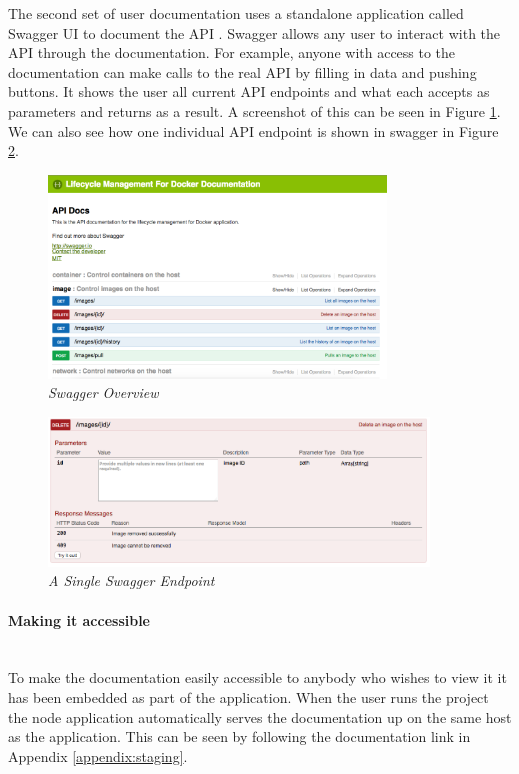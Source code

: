 The second set of user documentation uses a standalone application called Swagger UI to document the API \citep{Swagger2017}. Swagger allows any user to interact with the API through the documentation. For example, anyone with access to the documentation can make calls to the real API by filling in data and pushing buttons. It shows the user all current API endpoints and what each accepts as parameters and returns as a result. A screenshot of this can be seen in Figure \ref{fig:swagger-overview}. We can also see how one individual API endpoint is shown in swagger in Figure \ref{fig:swagger-individual}.

\begin{figure}[!ht]
\centering
\includegraphics*[width=0.8\textwidth]{images/swagger-overview}
\caption{\em Swagger Overview}
\label{fig:swagger-overview}
\end{figure}

\begin{figure}[!ht]
\centering
\includegraphics*[width=0.9\textwidth]{images/swagger-individual}
\caption{\em A Single Swagger Endpoint}
\label{fig:swagger-individual}
\end{figure}

\paragraph{Making it accessible}\mbox{}\\
To make the documentation easily accessible to anybody who wishes to view it it has been embedded as part of the application. When the user runs the project the node application automatically serves the documentation up on the same host as the application. This can be seen by following the documentation link in Appendix \ref{appendix:staging}.

